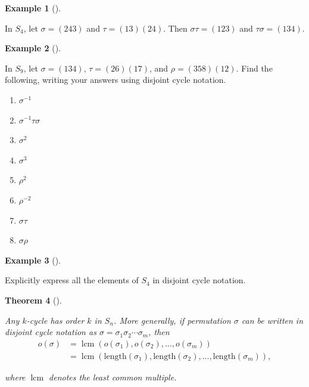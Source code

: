 \documentclass[10pt,]{book}
\theoremstyle{plain}
\newtheorem{theorem}{Theorem}[section]
\theoremstyle{definition}
\theoremstyle{definition}
\theoremstyle{definition}
\newtheorem{example}[theorem]{Example}
\theoremstyle{definition}
\numberwithin{equation}{section}
\DeclareMathOperator{\lcm}{lcm}
\newcommand{\amp}{ & }
\begin{document}
\begin{example}[]\label{example-56}

        In \(S_4\), let \(\sigma=(243)\) and \(\tau=(13)(24)\). Then \(\sigma \tau=(123)\) and \(\tau \sigma = (134).\)
\end{example}
\begin{example}[]\label{s9ex}

        In \(S_9\), let \(\sigma=(134)\), \(\tau=(26)(17)\), and \(\rho=(358)(12)\). Find the following, writing your answers using disjoint cycle notation.
\leavevmode%
\begin{multicols}{4}
\begin{enumerate}[label=\alph*]
\item\hypertarget{li-330}{}\(\sigma^{-1}\)%
\item\hypertarget{li-331}{}\(\sigma^{-1}\tau\sigma\)%
\item\hypertarget{li-332}{}\(\sigma^2\)%
\item\hypertarget{li-333}{}\(\sigma^3\)%
\item\hypertarget{li-334}{}\(\rho^2\)%
\item\hypertarget{li-335}{}\(\rho^{-2}\)%
\item\hypertarget{li-336}{}\(\sigma \tau\)%
\item\hypertarget{li-337}{}\(\sigma \rho\)%
\end{enumerate}
\end{multicols}
\end{example}
\begin{example}[]\label{example-58}

        Explicitly express all the elements of \(S_4\) in disjoint cycle notation.
\end{example}
\begin{theorem}[{}]\label{kcyc}

        Any \(k\)-cycle has order \(k\) in \(S_n\). More generally, if permutation \(\sigma\) can be written in disjoint cycle notation as \(\sigma=\sigma_1 \sigma_2 \cdots \sigma_m\), then
\begin{align*}
o(\sigma)\amp =\lcm(o(\sigma_1), o(\sigma_2),\ldots, o(\sigma_m))\\
\amp =\lcm(\mathrm{length}(\sigma_1),\mathrm{length}(\sigma_2),\ldots,\mathrm{length}(\sigma_m)),
\end{align*}

        where \(\lcm\) denotes the least common multiple.
\end{theorem}
\end{document}
